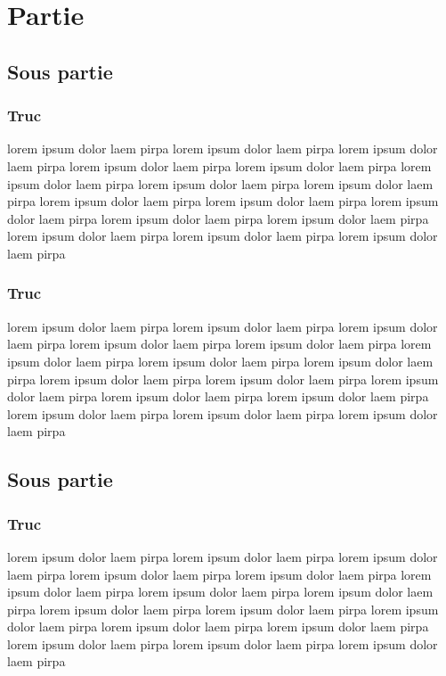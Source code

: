 \documentclass[11pt,fleqn]{book}
\begin{document}
								\chapter{Partie }
\section{Sous partie}
\subsection{Truc}
lorem  ipsum  dolor  laem  pirpa  lorem  ipsum  dolor  laem  pirpa  lorem  ipsum  dolor  laem  pirpa  lorem  ipsum  dolor  laem  pirpa  lorem  ipsum  dolor  laem  pirpa  lorem  ipsum  dolor  laem  pirpa  lorem  ipsum  dolor  laem  pirpa  lorem  ipsum  dolor  laem  pirpa  lorem  ipsum  dolor  laem  pirpa  lorem  ipsum  dolor  laem  pirpa  lorem  ipsum  dolor  laem  pirpa  lorem  ipsum  dolor  laem  pirpa  lorem  ipsum  dolor  laem  pirpa  lorem  ipsum  dolor  laem  pirpa  lorem  ipsum  dolor  laem  pirpa  lorem  ipsum  dolor  laem  pirpa 
~\\
\subsection{Truc}
lorem  ipsum  dolor  laem  pirpa  lorem  ipsum  dolor  laem  pirpa  lorem  ipsum  dolor  laem  pirpa  lorem  ipsum  dolor  laem  pirpa  lorem  ipsum  dolor  laem  pirpa  lorem  ipsum  dolor  laem  pirpa  lorem  ipsum  dolor  laem  pirpa  lorem  ipsum  dolor  laem  pirpa  lorem  ipsum  dolor  laem  pirpa  lorem  ipsum  dolor  laem  pirpa  lorem  ipsum  dolor  laem  pirpa  lorem  ipsum  dolor  laem  pirpa  lorem  ipsum  dolor  laem  pirpa  lorem  ipsum  dolor  laem  pirpa  lorem  ipsum  dolor  laem  pirpa  lorem  ipsum  dolor  laem  pirpa 
~\\
\section{Sous partie}
\subsection{Truc}
lorem  ipsum  dolor  laem  pirpa  lorem  ipsum  dolor  laem  pirpa  lorem  ipsum  dolor  laem  pirpa  lorem  ipsum  dolor  laem  pirpa  lorem  ipsum  dolor  laem  pirpa  lorem  ipsum  dolor  laem  pirpa  lorem  ipsum  dolor  laem  pirpa  lorem  ipsum  dolor  laem  pirpa  lorem  ipsum  dolor  laem  pirpa  lorem  ipsum  dolor  laem  pirpa  lorem  ipsum  dolor  laem  pirpa  lorem  ipsum  dolor  laem  pirpa  lorem  ipsum  dolor  laem  pirpa  lorem  ipsum  dolor  laem  pirpa  lorem  ipsum  dolor  laem  pirpa  lorem  ipsum  dolor  laem  pirpa 
~\\
\end{document}
